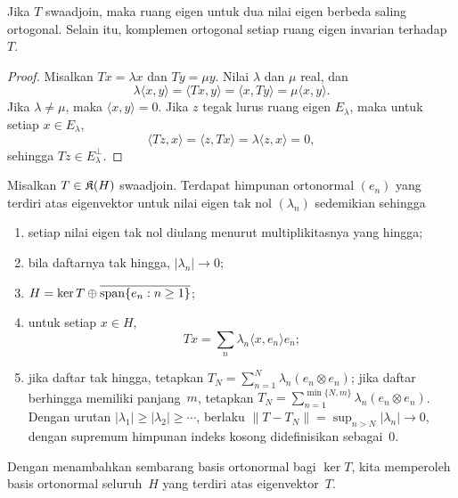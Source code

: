\begin{lem}\label{o008bridge:orthogonal-eigenspaces}
Jika $T$ swaadjoin, maka ruang eigen untuk dua nilai eigen berbeda saling
ortogonal. Selain itu, komplemen ortogonal setiap ruang eigen invarian
terhadap~$T$.
\end{lem}

\begin{proof}
Misalkan $Tx=\lambda x$ dan $Ty=\mu y$. Nilai $\lambda$ dan $\mu$ real, dan
\[
 \lambda\langle x,y\rangle
 =\langle Tx,y\rangle
 =\langle x,Ty\rangle
 =\mu\langle x,y\rangle.
\]
Jika $\lambda\neq\mu$, maka $\langle x,y\rangle=0$. Jika $z$ tegak lurus
ruang eigen $E_\lambda$, maka untuk setiap $x\in E_\lambda$,
\[
 \langle Tz,x\rangle=\langle z,Tx\rangle
 =\lambda\langle z,x\rangle=0,
\]
sehingga $Tz\in E_\lambda^\perp$.
\end{proof}

\begin{thm}
\label{o008bridge:compact-selfadjoint-spectral-theorem}
Misalkan $T\in\mathfrak{K}(H)$ swaadjoin. Terdapat himpunan ortonormal
$(e_n)$ yang terdiri atas eigenvektor untuk nilai eigen tak nol
$(\lambda_n)$ sedemikian sehingga
\begin{enumerate}[label=\rm{(\alph*)}]
  \item setiap nilai eigen tak nol diulang menurut multiplikitasnya yang
        hingga;
  \item bila daftarnya tak hingga, $|\lambda_n|\to0$;
  \item $H=\ker T\oplus\overline{\operatorname{span}\{e_n:n\geq1\}}$;
  \item untuk setiap $x\in H$,
        \[
          Tx=\sum_n\lambda_n\langle x,e_n\rangle e_n;
        \]
  \item jika daftar tak hingga, tetapkan
        $T_N=\sum_{n=1}^N\lambda_n(e_n\otimes e_n)$; jika daftar berhingga
        memiliki panjang~$m$, tetapkan
        $T_N=\sum_{n=1}^{\min\{N,m\}}\lambda_n(e_n\otimes e_n)$.
        Dengan urutan $|\lambda_1|\geq|\lambda_2|\geq\cdots$, berlaku
        $\|T-T_N\|=\sup_{n>N}|\lambda_n|\to0$, dengan supremum himpunan
        indeks kosong didefinisikan sebagai~$0$.
\end{enumerate}
Dengan menambahkan sembarang basis ortonormal bagi $\ker T$, kita memperoleh
basis ortonormal seluruh~$H$ yang terdiri atas eigenvektor~$T$.
\end{thm}

